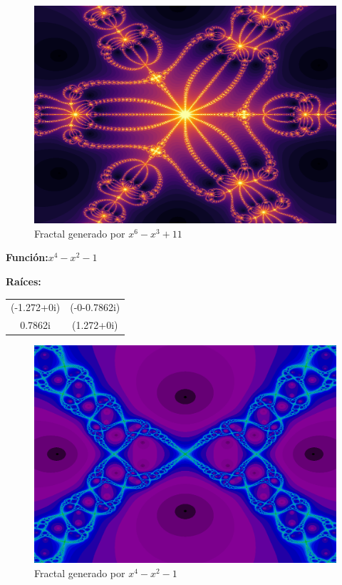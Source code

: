 \begin{figure}[H]
    \centering
    \includegraphics[scale=0.26]{images/ej2.png}
    \caption{Fractal generado por $x^6-x^3+11$}
    \label{fig:ej_2}
\end{figure}

\textbf{Función:}$x^4-x^2-1$

\textbf{Raíces:}

\begin{center}
\begin{tabular}{ c c  }
 (-1.272+0i) & (-0-0.7862i) \\
 0.7862i & (1.272+0i)
\end{tabular}
\end{center}

\begin{figure}[H]
    \centering
    \includegraphics[scale=0.26]{images/ej3.png}
    \caption{Fractal generado por $x^4-x^2-1$}
    \label{fig:ej_3}
\end{figure}

